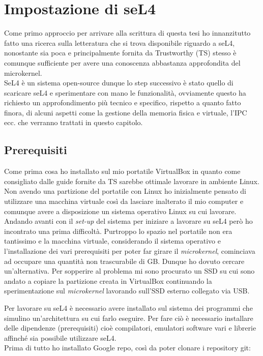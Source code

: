 \chapter{Impostazione di seL4}
Come primo approccio per arrivare alla scrittura di questa tesi ho innanzitutto fatto una ricerca sulla letteratura che si trova disponibile riguardo a seL4, nonostante sia poca e principalmente fornita da Trustworthy (TS) stesso è comunque sufficiente per avere una conoscenza abbastanza approfondita del microkernel.\\
SeL4 è un sistema open-source dunque lo step successivo è stato quello di scaricare seL4 e sperimentare con mano le funzionalità, ovviamente questo ha richiesto un approfondimento più tecnico e specifico, rispetto a quanto fatto finora, di alcuni aspetti come la gestione della memoria fisica e virtuale, l'IPC ecc. che verranno trattati in questo capitolo.

\section{Prerequisiti}
Come prima cosa ho installato sul mio portatile VirtualBox in quanto come consigliato dalle guide fornite da TS sarebbe ottimale lavorare in ambiente Linux. Non avendo una partizione del portatile con Linux ho inizialmente pensato di utilizzare una macchina virtuale così da lasciare inalterato il mio computer e comunque avere a disposizione un sistema operativo Linux su cui lavorare. Andando avanti con il \textit{set-up} del sistema per iniziare a lavorare su seL4 però ho incontrato una prima difficoltà. Purtroppo lo spazio nel portatile non era tantissimo e la macchina virtuale, considerando il sistema operativo e l'installazione dei vari prerequisiti per poter far girare il \textit{microkernel}, cominciava ad occupare una quantità non trascurabile di GB. Dunque ho dovuto cercare un'alternativa. Per sopperire al problema mi sono procurato un SSD su cui sono andato a copiare la partizione creata in VirtualBox continuando la sperimentazione sul \textit{microkernel} lavorando sull'SSD esterno collegato via USB.

Per lavorare su seL4 è necessario avere installato sul sistema dei programmi che simulino un'architettura su cui farlo eseguire. Per fare ciò è necessario installare delle dipendenze (prerequisiti) cioè compilatori, emulatori software vari e librerie affinché sia possibile utilizzare seL4.\\
Prima di tutto ho installato Google repo, così da poter clonare i repository git:

